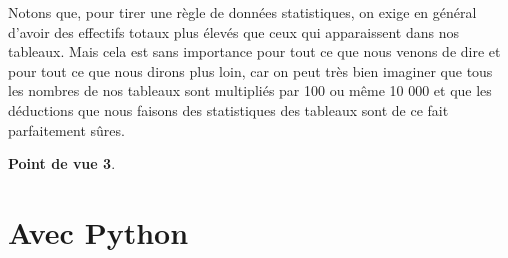 \documentclass[10pt,dvipsnames, dvips, svgnames]{article}
\newcommand{\code}[1]{\fcolorbox{black}{cyan!10}{\lstinline!#1!}}
\begin{document}
\begin{list}{}{}
Notons que, pour tirer une règle de données statistiques, on exige en général d'avoir des effectifs totaux plus élevés que ceux qui apparaissent dans nos tableaux. Mais cela est sans importance pour tout ce que nous venons de dire et pour tout ce que nous dirons plus loin, car on peut très bien imaginer que tous les nombres de nos tableaux sont multipliés par 100 ou même 10 000 et que les déductions que nous faisons des statistiques des tableaux sont de ce fait parfaitement sûres.







\item  \textbf{Point de vue 3}. 
\end{list}

\newpage
\section{Avec Python}

%
%
%
%
%
\end{document}
